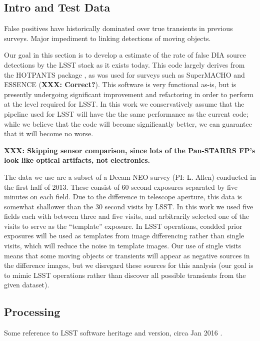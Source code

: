 
\subsection{Intro and Test Data}

False positives have historically dominated over true transients in previous
surveys. \citep{denneau13, goldstein15, kessler15} Major impediment to linking
detections of moving objects.

Our goal in this section is to develop a estimate of the rate of
false DIA source detections by the LSST stack as it exists today. This code
largely derives from the HOTPANTS package \citep{becker15}, as was used for
surveys such as SuperMACHO and ESSENCE (\textbf{XXX: Correct?}). This software
is very functional as-is, but is presently undergoing significant improvement
and refactoring in order to perform at the level required for LSST. In this work
we conservatively assume that the pipeline used for LSST will have the the same
performance as the current code; while we believe that the code will become
significantly better, we can guarantee that it will become no worse.

\textbf{XXX: Skipping sensor comparison, since lots of the Pan-STARRS FP's look like
optical artifacts, not electronics.}

The data we use are a subset of a Decam NEO survey (PI: L. Allen) conducted in
the first half of 2013. These consist of 60 second exposures separated by five
minutes on each field. Due to the difference in telescope aperture, this data is
somewhat shallower than the 30 second visits by LSST. In this work we used five
fields each with between three and five visits, and arbitrarily selected one of
the visits to serve as the ``template'' exposure. In LSST operations, coadded
prior exposures will be used as templates from image differencing rather than
single visits, which will reduce the noise in template images. Our use of single
visits means that some moving objects or transients will appear as negative
sources in the difference images, but we disregard these sources for this
analysis (our goal is to mimic LSST operations rather than discover all possible
transients from the given dataset).

\subsection{Processing}

Some reference to LSST software heritage and version, circa Jan 2016
\citep{juric15}.

